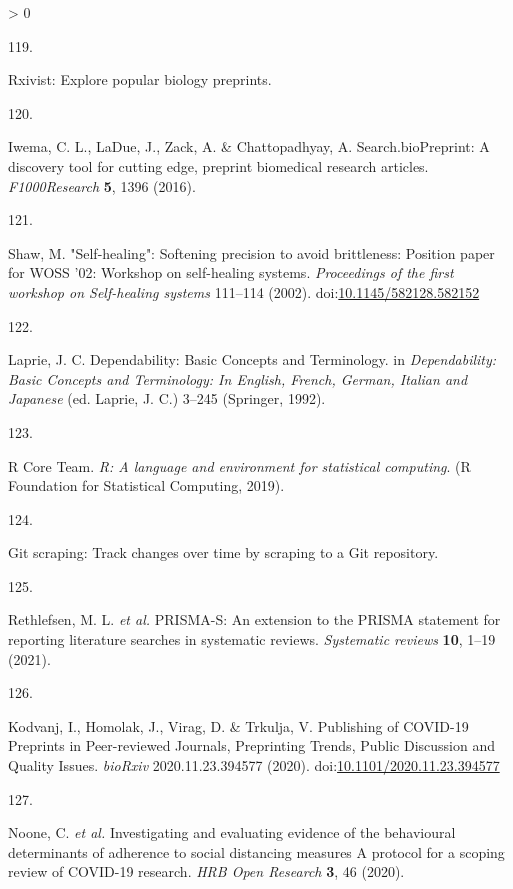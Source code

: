 \documentclass[a4paper, twoside]{templates/ociamthesis}
\newlength{\cslhangindent}
\newlength{\csllabelwidth}
\newenvironment{CSLReferences}[3] %
 {%
  \setlength{\parindent}{0pt}
  \ifodd #1 \everypar{\setlength{\hangindent}{\cslhangindent}}\ignorespaces\fi
  \ifnum #2 > 0
  \setlength{\parskip}{#2\baselineskip}
  \fi
 }%
 {}
\newcommand{\CSLLeftMargin}[1]{\parbox[t]{\maxof{\widthof{#1}}{\csllabelwidth}}{#1}}
\newcommand{\CSLRightInline}[1]{\parbox[t]{\linewidth - \csllabelwidth}{#1}}
\begin{document}
\begin{CSLReferences}{0}{0}
\leavevmode\hypertarget{ref-zotero-15027}{}%
\CSLLeftMargin{119. }
\CSLRightInline{Rxivist: Explore popular biology preprints.}

\leavevmode\hypertarget{ref-iwema2016}{}%
\CSLLeftMargin{120. }
\CSLRightInline{Iwema, C. L., LaDue, J., Zack, A. \& Chattopadhyay, A. Search.{bioPreprint}: A discovery tool for cutting edge, preprint biomedical research articles. \emph{F1000Research} \textbf{5}, 1396 (2016).}

\leavevmode\hypertarget{ref-shaw2002}{}%
\CSLLeftMargin{121. }
\CSLRightInline{Shaw, M. "{Self}-healing": Softening precision to avoid brittleness: Position paper for {WOSS} '02: Workshop on self-healing systems. \emph{Proceedings of the first workshop on Self-healing systems} 111--114 (2002). doi:\href{https://doi.org/10.1145/582128.582152}{10.1145/582128.582152}}

\leavevmode\hypertarget{ref-laprie1992}{}%
\CSLLeftMargin{122. }
\CSLRightInline{Laprie, J. C. Dependability: Basic {Concepts} and {Terminology}. in \emph{Dependability: Basic {Concepts} and {Terminology}: In {English}, {French}, {German}, {Italian} and {Japanese}} (ed. Laprie, J. C.) 3--245 ({Springer}, 1992).}

\leavevmode\hypertarget{ref-rcoreteam2019}{}%
\CSLLeftMargin{123. }
\CSLRightInline{R Core Team. \emph{R: A language and environment for statistical computing}. ({R Foundation for Statistical Computing}, 2019).}

\leavevmode\hypertarget{ref-zotero-15031}{}%
\CSLLeftMargin{124. }
\CSLRightInline{Git scraping: Track changes over time by scraping to a {Git} repository.}

\leavevmode\hypertarget{ref-rethlefsen2021prisma}{}%
\CSLLeftMargin{125. }
\CSLRightInline{Rethlefsen, M. L. \emph{et al.} {PRISMA}-{S}: An extension to the {PRISMA} statement for reporting literature searches in systematic reviews. \emph{Systematic reviews} \textbf{10}, 1--19 (2021).}

\leavevmode\hypertarget{ref-kodvanj2020}{}%
\CSLLeftMargin{126. }
\CSLRightInline{Kodvanj, I., Homolak, J., Virag, D. \& Trkulja, V. Publishing of {COVID}-19 {Preprints} in {Peer}-reviewed {Journals}, {Preprinting Trends}, {Public Discussion} and {Quality Issues}. \emph{bioRxiv} 2020.11.23.394577 (2020). doi:\href{https://doi.org/10.1101/2020.11.23.394577}{10.1101/2020.11.23.394577}}

\leavevmode\hypertarget{ref-noone2020}{}%
\CSLLeftMargin{127. }
\CSLRightInline{Noone, C. \emph{et al.} Investigating and evaluating evidence of the behavioural determinants of adherence to social distancing measures {} {A} protocol for a scoping review of {COVID}-19 research. \emph{HRB Open Research} \textbf{3}, 46 (2020).}


\end{CSLReferences}
\end{document}
